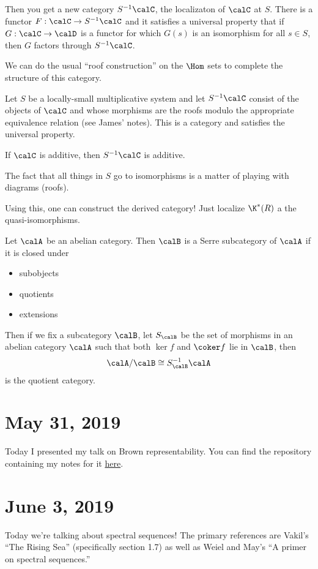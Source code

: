 \documentclass[12pt]{article}
\begin{document}
Then you get a new category $S^{-1}\calC$, the localizaton of $\calC$ at $S$. There is a functor $F:\calC\to S^{-1}\calC$ and it satisfies 
a universal property that if $G:\calC\to\calD$ is a functor for which $G(s)$ is an isomorphism for all $s\in S$, then $G$
factors through $S^{-1}\calC$.

We can do the usual ``roof construction'' on the $\Hom$ sets to complete the structure of this category.
\begin{thm}
	Let $S$ be a locally-small multiplicative system and let $S^{-1}\calC$ consist of the objects of $\calC$
	and whose morphisms are the roofs modulo the appropriate equivalence relation (see James' notes). This is a category and 
	satisfies the universal property.
\end{thm}
\begin{rmk}
	If $\calC$ is additive, then $S^{-1}\calC$ is additive.
\end{rmk}
\begin{rmk}
	The fact that all things in $S$ go to isomorphisms is a matter of playing with diagrams (roofs).
\end{rmk}

Using this, one can construct the derived category! Just localize $\K^\ast(R)$ a the quasi-isomorphisms.

\begin{defn}
	Let $\calA$ be an abelian category. Then $\calB$ is a Serre subcategory of $\calA$ if it is closed under
	\begin{itemize}
		\item subobjects
		\item quotients
		\item extensions
	\end{itemize}
\end{defn}
Then if we fix a subcategory $\calB$, let $S_\calB$ be the set of morphisms in an abelian category $\calA$ such that
both $\ker f$ and $\coker f$ lie in $\calB$, then 
\[\calA/\calB\cong S_\calB^{-1}\calA\]
is the quotient category.

\section{May 31, 2019}
Today I presented my talk on Brown representability. You can find the repository containing my notes for it \href{https://github.com/NicoCourts/Brown-Representability}{here}.

\section{June 3, 2019}
Today we're talking about spectral sequences! The primary references are Vakil's ``The Rising Sea'' (specifically section 1.7)
as well as Weiel and May's ``A primer on spectral sequences.''
\end{document}
